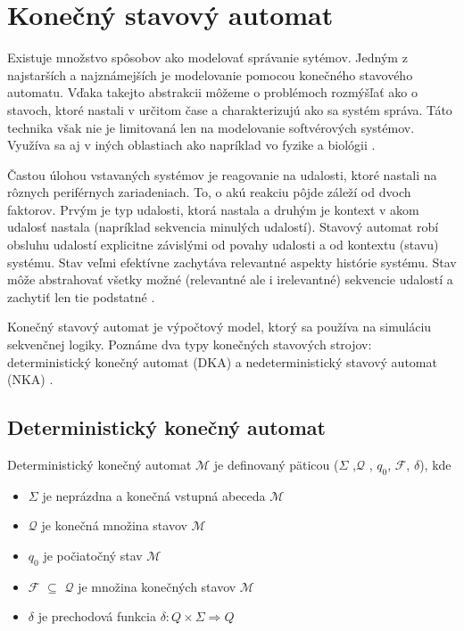 \section{Konečný stavový automat}
\noindent Existuje množstvo spôsobov ako modelovať správanie sytémov. Jedným z 
najstarších a najznámejších je modelovanie pomocou konečného stavového automatu.
Vďaka takejto abstrakcii môžeme o problémoch rozmýšľať ako o stavoch, ktoré nastali v určitom čase a charakterizujú ako sa systém správa. 
Táto technika však nie je limitovaná len na modelovanie softvérových systémov. Využíva sa aj v iných oblastiach ako napríklad vo fyzike a biológii \cite{WaybackMachine2014}. 
\par Častou úlohou vstavaných systémov je reagovanie na udalosti, ktoré nastali  na rôznych 
periférnych zariadeniach. To, o akú reakciu pôjde záleží od dvoch faktorov. Prvým je typ
udalosti, ktorá nastala a druhým je kontext v akom udalosť nastala 
(napríklad sekvencia minulých udalostí). Stavový automat robí obsluhu udalostí explicitne závislými od povahy udalosti a od kontextu (stavu) systému. 
Stav veľmi efektívne zachytáva relevantné aspekty histórie systému. 
Stav môže abstrahovať všetky možné (relevantné ale i irelevantné) sekvencie udalostí a zachytiť len tie podstatné \cite{samekStateMachinesEventDriven2016}.
\par Konečný stavový automat je výpočtový model, ktorý sa používa na simuláciu sekvenčnej logiky. 
Poznáme dva typy konečných stavových strojov: deterministický konečný automat (DKA)  a nedeterministický stavový automat (NKA) \cite{FiniteStateMachines}. 

\subsection{Deterministický konečný automat}
\noindent Deterministický konečný automat $\mathcal{M}$ je definovaný päticou ($\Sigma$ ,$\mathcal{Q}$ , $q_0$, $\mathcal{F}$, $\delta$), kde
\begin{itemize}
    \item $\Sigma$ je neprázdna a konečná vstupná abeceda $\mathcal{M}$
    \item $\mathcal{Q}$ je konečná množina stavov $\mathcal{M}$
    \item $q_0$ je počiatočný stav $\mathcal{M}$
    \item $\mathcal{F}$ $\subseteq$ $\mathcal{Q}$ je množina konečných stavov $\mathcal{M}$
    \item $\delta$ je prechodová funkcia  \begin{math}\delta : Q \times \Sigma \Rightarrow Q\end{math}
\end{itemize}

